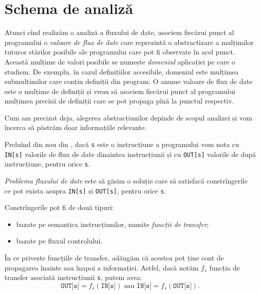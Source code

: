 
\section{Schema de analiză}
\label{sec:schema}

Atunci cînd realizăm o analiză a fluxului de date, asociem fiecărui
punct al programului o \emph{valoare de flux de date} care reprezintă
o abstractizare a mulțimilor tuturor stărilor posibile ale programului
care pot fi observate în acel punct. Această mulțime de valori posibile
se numește \emph{domeniul} aplicației pe care o studiem. De exemplu,
în cazul definițiilor accesibile, domeniul este mulțimea submulțimilor
care conțin definiții din program. O anume valoare de flux de date este
o mulțime de definiții și vrem să asociem fiecărui punct al programului
mulțimea precisă de definiții care se pot propaga pînă la punctul respectiv.

Cum am precizat deja, alegerea abstracțiunilor depinde de scopul analizei
și vom încerca să păstrăm doar informațiile relevante.

Preluînd din nou din \cite{aho}, dacă \texttt{s} este o instrucțiune a
programului vom nota cu \texttt{IN[s]} valorile de flux de date dinaintea
instrucțiunii și cu \texttt{OUT[s]} valorile de după instrucțiune,
pentru orice \texttt{s}.

\emph{Problema fluxului de date} este să găsim o soluție care să satisfacă
constrîngerile ce pot exista asupra \texttt{IN[s]} și \texttt{OUT[s]}, pentru
orice \texttt{s}.

Constrîngerile pot fi de două tipuri:
\begin{itemize}
\item bazate pe semantica instrucțiunilor, numite \emph{funcții de transfer};
\item bazate pe fluxul controlului.
\end{itemize}

În ce privește funcțiile de transfer, adăugăm că acestea pot ține cont
de propagarea înainte sau înapoi a informației. Astfel, dacă notăm $ f_s $
funcția de transfer asociată instrucțiunii \texttt{s}, putem avea:
\[
  \texttt{OUT[s]} = f_s(\texttt{IN[s]}) \text{ sau } %
  \texttt{IN[s]} = f_s(\texttt{OUT[s]}).
\]

